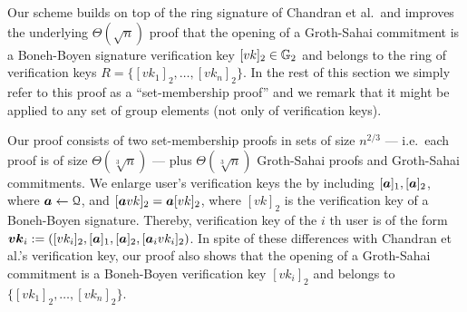 

%
%
%

Our scheme builds on top of the ring signature of Chandran et al.~and improves the underlying $\Theta(\sqrt{n})$ proof that the opening of a Groth-Sahai commitment is a Boneh-Boyen signature verification key $[vk]_2\in\mathbb{G}_2$ and belongs to the ring of verification keys $R=\{[vk_1]_2,\ldots,[vk_n]_2\}$. In the rest of this section we simply refer to this proof as a ``set-membership proof'' and we remark that it might be applied to any set of group elements (not only of verification keys).

Our proof consists of two set-membership proofs in sets of size $n^{2/3}$ --- i.e.~each proof is of size $\Theta(\sqrt[3]{n})$ ---  plus $\Theta(\sqrt[3]{n})$ Groth-Sahai proofs and Groth-Sahai commitments.
We enlarge user's verification keys the by including $[{\boldsymbol{a}}]_1,[{\boldsymbol{a}}]_2$, where ${\boldsymbol{a}}\gets\mathcal{Q}$, and $[{\boldsymbol{a}}vk]_2={\boldsymbol{a}}[vk]_2$, where $[vk]_2$ is the verification key of a Boneh-Boyen signature. Thereby, verification key of the $i$ th user is of the form ${\boldsymbol{vk}}_i:=([vk_i]_2,[{\boldsymbol{a}}]_1,[{\boldsymbol{a}}]_2,[{\boldsymbol{a}}_ivk_i]_2)$. In spite of these differences with Chandran et al.'s verification key, our proof also shows that the opening of a Groth-Sahai commitment is a Boneh-Boyen verification key $[vk_i]_2$ and belongs to $\{[vk_1]_2,\ldots,[vk_n]_2\}$.

